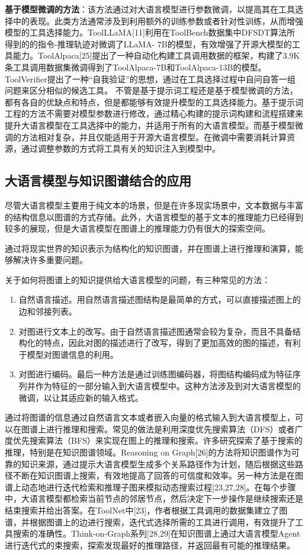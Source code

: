 \textbf{基于模型微调的方法}：该方法通过对大语言模型进行参数微调，以提高其在工具选择中的表现。此类方法通常涉及到利用额外的训练参数或者针对性训练，从而增强模型的工具选择能力。ToolLLaMA[11]利用在ToolBench数据集中DFSDT算法所得到的的指令-推理轨迹对微调了LLaMA- 7B的模型，有效增强了开源大模型的工具能力。ToolAlpaca[25]提出了一种自动化构建工具调用数据的框架，构建了3.9K条工具调用数据集微调得到了ToolAlpaca-7B和ToolAlpaca-13B的模型。ToolVerifier提出了一种“自我验证”的思想，通过在工具选择过程中自问自答一组问题来区分相似的候选工具。
不管是基于提示词工程还是基于模型微调的方法，都有各自的优缺点和特点，但是都能够有效提升模型的工具选择能力。基于提示词工程的方法不需要对模型参数进行修改，通过精心构建的提示词构建和流程搭建来提升大语言模型在工具选择中的能力，并适用于所有的大语言模型。而基于模型微调的方法相对复杂，并且仅能适用于开源大语言模型。在微调中需要消耗计算资源，通过调整参数的方式将工具有关的知识注入到模型中。


\subsection{大语言模型与知识图谱结合的应用}

尽管大语言模型主要用于纯文本的场景，但是在许多现实场景中，文本数据与丰富的结构信息以图谱的方式存储。此外，大语言模型的基于文本的推理能力已经得到较多的展现，但是大语言模型在图谱上的推理能力仍有很大的探索空间。

通过将现实世界的知识表示为结构化的知识图谱，并在图谱上进行推理和演算，能够解决许多重要问题。

关于如何将图谱上的知识提供给大语言模型的问题，有三种常见的方法：

\begin{enumerate}
    \item 自然语言描述。用自然语言描述图结构是最简单的方式，可以直接描述图上的边和邻接列表。
    \item 对图进行文本上的改写。由于自然语言描述图通常会较为复杂，而且不具备结构化的特点，因此对图的描述进行了改写，得到了更加高效的图的描述，有利于模型对图谱信息的利用。
    \item 对图进行编码。最后一种方法是通过训练图编码器，将图结构编码成为特征序列并作为特征的一部分输入到大语言模型中。这种方法涉及到对大语言模型的微调，以让其适应新的输入格式。
\end{enumerate}

通过将图谱的信息通过自然语言文本或者嵌入向量的格式输入到大语言模型上，可以在图谱上进行推理和搜索。常见的做法是利用深度优先搜索算法（DFS）或者广度优先搜索算法（BFS）来实现在图上的推理和搜索。许多研究探索了基于搜索的推理，特别是在知识图谱领域。Reasoning on Graph[26]的方法将知识图谱作为可靠的知识来源，通过提示大语言模型生成多个关系路径作为计划，随后根据这些路径不断在知识图谱上搜索，有效地提高了回答的可信度和效率。另一种方法是在图谱上动态地进行迭代检索和推理子图来模拟动态搜索过程[23,27,28]。在每个步骤中，大语言模型都检索当前节点的邻居节点，然后决定下一步操作是继续搜索还是结束搜索并给出答案。在ToolNet中[23]，作者根据工具调用的数据集建立了图谱，并根据图谱上的边进行搜索，迭代式选择所需的工具进行调用，有效提升了工具搜索的准确性。Think-on-Graph系列[28,29]在知识图谱上通过大语言模型Agent进行迭代式的束搜索，探索发现最好的推理路径，并返回最有可能的推理结果。

